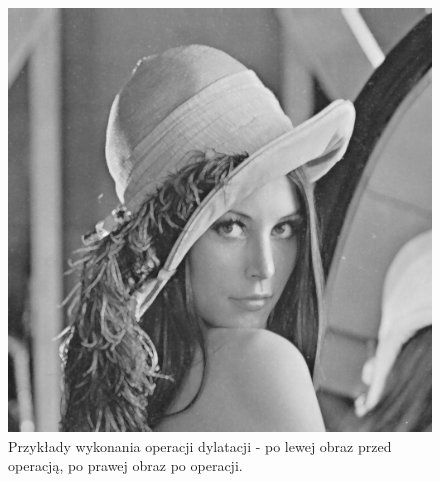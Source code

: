 \documentclass{article}
\begin{document}
\begin{figure}[!htb]
\includegraphics[scale=0.2]{img/Dylatacja_Obrazu_lena_8bit.png} 
\caption{Przykłady wykonania operacji dylatacji - po lewej obraz przed operacją, po prawej obraz po operacji. }
\end{figure}

\FloatBarrier
\end{document}
